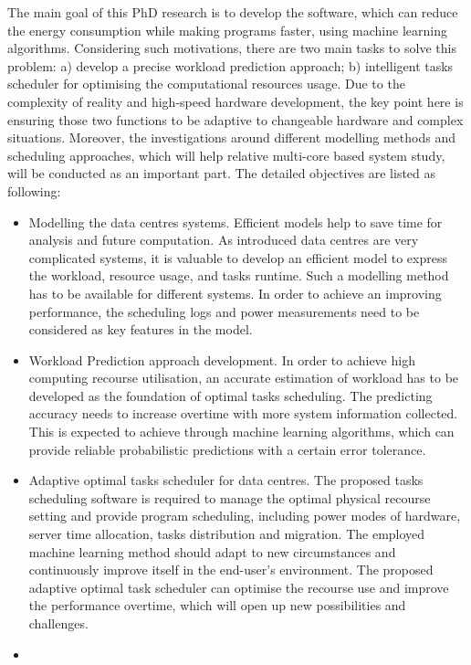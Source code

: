 \documentclass[11pt]{article}
\begin{document}
The main goal of this PhD research is to develop the software, which can reduce the energy consumption while making programs faster, using machine learning algorithms. Considering such motivations, there are two main tasks to solve this problem: a) develop a precise workload prediction approach; b) intelligent tasks scheduler for optimising the computational resources usage. Due to the complexity of reality and high-speed hardware development, the key point here is ensuring those two functions to be adaptive to changeable hardware and complex situations. Moreover, the investigations around different modelling methods and scheduling approaches, which will help relative multi-core based system study, will be conducted as an important part. The detailed objectives are listed as following:
\begin{itemize}
\item
Modelling the data centres systems. Efficient models help to save time for analysis and future computation. As introduced data centres are very complicated systems, it is valuable to develop an efficient model to express the workload, resource usage, and tasks runtime. Such a modelling method has to be available for different systems. In order to achieve an improving performance, the scheduling logs and power measurements need to be considered as key features in the model.  
\item
Workload Prediction approach development. In order to achieve high computing recourse utilisation, an accurate estimation of workload has to be developed as the foundation of optimal tasks scheduling. The predicting accuracy needs to increase overtime with more system information collected. This is expected to achieve through machine learning algorithms, which can provide reliable probabilistic predictions with a certain error tolerance.  
\item
Adaptive optimal tasks scheduler for data centres. The proposed  tasks scheduling software is required to manage the optimal physical recourse setting and provide program scheduling, including power modes of hardware, server time allocation, tasks distribution and migration. The employed machine learning method should adapt to new circumstances and continuously improve itself in the end-user's environment. The proposed adaptive optimal task scheduler can optimise the recourse use and improve the performance overtime, which will open up new possibilities and challenges.
\item

\end{itemize}
\end{document}
